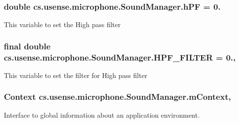 \subsubsection[{h\+P\+F}]{\setlength{\rightskip}{0pt plus 5cm}double cs.\+usense.\+microphone.\+Sound\+Manager.\+h\+P\+F = 0.\hspace{0.3cm}{\ttfamily [private]}}\label{classcs_1_1usense_1_1microphone_1_1_sound_manager_a084f0ee4775fa8409368743eaa35c261}
This variable to set the High pass filter \hypertarget{classcs_1_1usense_1_1microphone_1_1_sound_manager_ace3edd2393c86123473d78860e48ee6a}{}
\subsubsection[{H\+P\+F\+\_\+\+F\+I\+L\+T\+E\+R}]{\setlength{\rightskip}{0pt plus 5cm}final double cs.\+usense.\+microphone.\+Sound\+Manager.\+H\+P\+F\+\_\+\+F\+I\+L\+T\+E\+R = 0.\hspace{0.3cm}{\ttfamily [static]}, {\ttfamily [private]}}\label{classcs_1_1usense_1_1microphone_1_1_sound_manager_ace3edd2393c86123473d78860e48ee6a}
This variable to set the filter for High pass filter \hypertarget{classcs_1_1usense_1_1microphone_1_1_sound_manager_a5a69cb1ee55ad355470977fd94a9b190}{}
\subsubsection[{m\+Context}]{\setlength{\rightskip}{0pt plus 5cm}Context cs.\+usense.\+microphone.\+Sound\+Manager.\+m\+Context\hspace{0.3cm}{\ttfamily [static]}, {\ttfamily [private]}}\label{classcs_1_1usense_1_1microphone_1_1_sound_manager_a5a69cb1ee55ad355470977fd94a9b190}
Interface to global information about an application environment. \hypertarget{classcs_1_1usense_1_1microphone_1_1_sound_manager_ae449a315ff7fb69c5b46ed55145d4e35}{}
